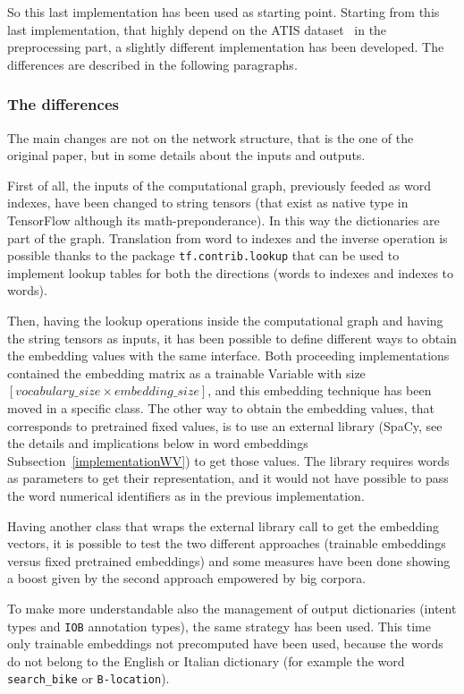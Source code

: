 So this last implementation has been used as starting point. Starting from this last implementation, that highly depend on the ATIS dataset~\cite{hemphill1990atis} in the preprocessing part, a slightly different implementation has been developed. The differences are described in the following paragraphs.

\subsubsection{The differences}
The main changes are not on the network structure, that is the one of the original paper, but in some details about the inputs and outputs.

First of all, the inputs of the computational graph, previously feeded as word indexes, have been changed to string tensors (that exist as native type in TensorFlow although its math-preponderance). In this way the dictionaries are part of the graph. Translation from word to indexes and the inverse operation is possible thanks to the package \texttt{tf.contrib.lookup} that can be used to implement lookup tables for both the directions (words to indexes and indexes to words).

Then, having the lookup operations inside the computational graph and having the string tensors as inputs, it has been possible to define different ways to obtain the embedding values with the same interface. Both proceeding implementations contained the embedding matrix as a trainable Variable with size $\left[ vocabulary\_size  \times  embedding\_size \right]$, and this embedding technique has been moved in a specific class. The other way to obtain the embedding values, that corresponds to pretrained fixed values, is to use an external library (SpaCy, see the details and implications below in word embeddings Subsection~\ref{implementationWV}) to get those values. The library requires words as parameters to get their representation, and it would not have possible to pass the word numerical identifiers as in the previous implementation.

Having another class that wraps the external library call to get the embedding vectors, it is possible to test the two different approaches (trainable embeddings versus fixed pretrained embeddings) and some measures have been done showing a boost given by the second approach empowered by big corpora.

To make more understandable also the management of output dictionaries (intent types and \texttt{IOB} annotation types), the same strategy has been used. This time only trainable embeddings not precomputed have been used, because the words do not belong to the English or Italian dictionary (for example the word \texttt{search\_bike} or \texttt{B-location}).

